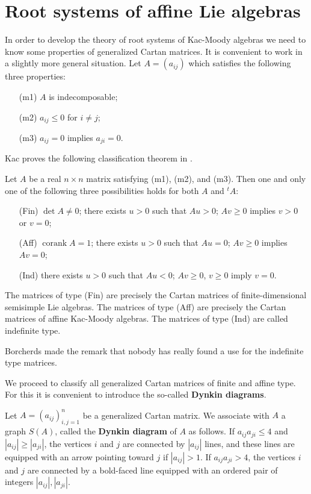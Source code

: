 \documentclass[12pt]{article}
\begin{document}
\begin{exercise}
\end{exercise}

\section{Root systems of affine Lie algebras}
In order to develop the theory of root systems of Kac-Moody algebras we need to know some properties of generalized Cartan matrices. It is convenient to work in a slightly more general situation. Let $A = (a_{ij})$ which satisfies the following three properties:
\begin{itemize}
    \item[(m1)] $A$ is indecomposable;
    \item[(m2)] $a_{ij} \leq 0$ for $i \neq j$;
    \item[(m3)] $a_{ij} = 0$ implies $a_{ji} = 0$.
\end{itemize}
Kac proves the following classification theorem in \cite{kac}.
\begin{theorem}
    Let $A$ be a real $n \times n$ matrix satisfying (m1), (m2), and (m3). Then one and only one of the following three possibilities holds for both $A$ and ${}^t A$:
    \begin{itemize}
        \item[(Fin)] $\det A \neq 0$; there exists $u > 0$ such that $Au > 0$; $Av \geq 0$ implies $v > 0$ or $v = 0$;
        \item[(Aff)] $\operatorname{corank} A = 1$; there exists $u > 0$ such that $Au = 0$; $Av \geq 0$ implies $Av = 0$;
        \item[(Ind)] there exists $u > 0$ such that $Au < 0$; $Av \geq 0$, $v \geq 0$ imply $v = 0$.
    \end{itemize}
\end{theorem}

\begin{remark}
    The matrices of type (Fin) are precisely the Cartan matrices of finite-dimensional semisimple Lie algebras. The matrices of type (Aff) are precisely the Cartan matrices of affine Kac-Moody algebras. The matrices of type (Ind) are called indefinite type.

    Borcherds made the remark that nobody has really found a use for the indefinite type matrices.
\end{remark}

We proceed to classify all generalized Cartan matrices of finite and affine type.
For this it is convenient to introduce the so-called \textbf{Dynkin diagrams}.
\begin{definition}
    Let $A=(a_{ij})_{i,j=1}^n$ be a generalized Cartan matrix.  We associate with $A$ a graph $S(A)$, called the \textbf{Dynkin diagram} of $A$ as follows. If $a_{ij}a_{ji}\leq 4$ and $|a_{ij}|\geq |a_{ji}|$, the vertices $i$ and $j$ are connected by $|a_{ij}|$ lines, and these lines are equipped with an arrow pointing toward $j$ if $|a_{ij}|>1$.
    If $a_{ij}a_{ji}>4$, the vertices $i$ and $j$ are connected by a bold-faced line
    equipped with an ordered pair of integers $|a_{ij}|,|a_{ji}|$.
\end{definition}
\end{document}
